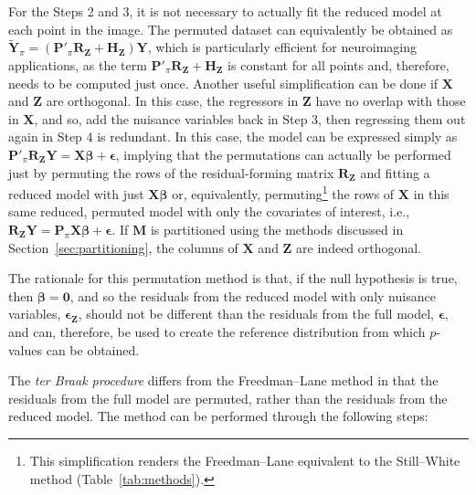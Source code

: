 For the Steps 2 and 3, it is not necessary to actually fit the reduced model at each point in the image. The permuted dataset can equivalently be obtained as $\mathbf{\tilde{Y}}_{\pi} = \left(\mathbf{P}'_{\pi}\mathbf{R}_{\mathbf{Z}}+\mathbf{H}_{\mathbf{Z}}\right)\mathbf{Y}$, which is particularly efficient for neuroimaging applications, as the term $\mathbf{P}'_{\pi}\mathbf{R}_{\mathbf{Z}}+\mathbf{H}_{\mathbf{Z}}$ is constant for all points and, therefore, needs to be computed just once. Another useful simplification can be done if $\mathbf{X}$ and $\mathbf{Z}$ are orthogonal. In this case, the regressors in $\mathbf{Z}$ have no overlap with those in $\mathbf{X}$, and so, add the nuisance variables back in Step 3, then regressing them out again in Step 4 is redundant. In this case, the model can be expressed simply as $\mathbf{P}'_{\pi}\mathbf{R}_{\mathbf{Z}}\mathbf{Y}=\mathbf{X}\boldsymbol{\beta}+\boldsymbol{\epsilon}$, implying that the permutations can actually be performed just by permuting the rows of the residual-forming matrix $\mathbf{R}_{\mathbf{Z}}$ and fitting a reduced model with just $\mathbf{X}\boldsymbol{\beta}$ or, equivalently, permuting\footnote{This simplification renders the Freedman--Lane equivalent to the Still--White method (Table~\ref{tab:methods}).} the rows of $\mathbf{X}$ in this same reduced, permuted model with only the covariates of interest, i.e., $\mathbf{R}_{\mathbf{Z}}\mathbf{Y}=\mathbf{P}_{\pi}\mathbf{X}\boldsymbol{\beta}+\boldsymbol{\epsilon}$. If $\mathbf{M}$ is partitioned using the methods discussed in Section~\ref{sec:partitioning}, the columns of $\mathbf{X}$ and $\mathbf{Z}$ are indeed orthogonal.

The rationale for this permutation method is that, if the null hypothesis is true, then $\boldsymbol{\beta}=\mathbf{0}$, and so the residuals from the reduced model with only nuisance variables, $\boldsymbol{\epsilon}_{\mathbf{Z}}$, should not be different than the residuals from the full model, $\boldsymbol{\epsilon}$, and can, therefore, be used to create the reference distribution from which $p$-values can be obtained.

The \emph{ter Braak procedure} \citep{TerBraak1992} differs from the Freedman--Lane method in that the residuals from the full model are permuted, rather than the residuals from the reduced model. The method can be performed through the following steps:

